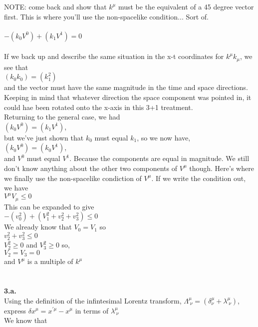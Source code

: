 \documentclass[prb,preprint]
{revtex4-1}
\newcommand{\PRLsep}{\noindent\makebox[\linewidth]{\resizebox{0.8888\linewidth}{2pt}{$\bullet$}}\bigskip}
\begin{document}
NOTE:  come back and show that $k^\mu$ must be the equivalent of a 45 degree vector first.  This is where you'll use the non-spacelike condition... Sort of.
\\
\\
$-\left(k_0 V^0\right) + \left(k_1 V^1\right) = 0$
\\
\\
If we back up and describe the same situation in the x-t coordinates for $k^\mu k_\mu$, we see that 
\\
$\left(k_0 k_0\right) = \left(k_1^2\right)$
\\
and the vector must have the same magnitude in the time and space directions.  Keeping in mind that whatever direction the space component was pointed in, it could hae been rotated onto the x-axis in this 3+1 treatment.
\\
Returning to the general case, we had 
\\
$\left(k_0 V^0\right) = \left(k_1 V^1\right)$, 
\\
but we've just shown that $k_0$ must equal $k_1$, so we now have, 
\\
$\left(k_0 V^0\right) = \left(k_0 V^1\right)$, 
\\
and $V^0$ must equal $V^1$.  Because the components are equal in magnitude.  We still don't know anything about the other two components of $V^\mu$ though.  Here's where we finally use the non-spacelike condiction of $V^\mu$.  If we write the condition out, we have 
\\
$V^\mu V_\mu \leq 0$
\\
This can be expanded to give 
\\
$-\left(v_0^2\right) + \left(V_1^2 + v_2^2 + v_3^2\right) \leq 0$
\\
We already know that $V_0 = V_1$ so
\\
$v_2^2 + v_3^2 \leq 0$
\\
$V_2^2 \geq 0$ and $V_3^2 \geq 0$ so,
\\
$V_2 = V_3 = 0$
\\
and $V^\mu$ is a multiple of $k^\mu$
\\
\\
\PRLsep
\\
\textbf{3.a.}
\\
Using the definition of the infintesimal Lorentz transform, $\Lambda^\mu_{\;\nu} = \left(\delta^\mu_\nu + \lambda^\mu_{\;\nu}\right)$, 
express $\delta x^\mu = x^{\prime\mu} - x^\mu$ in terms of $\lambda^\mu_{\;\nu}$
\\
We know that 
\\
\end{document}
